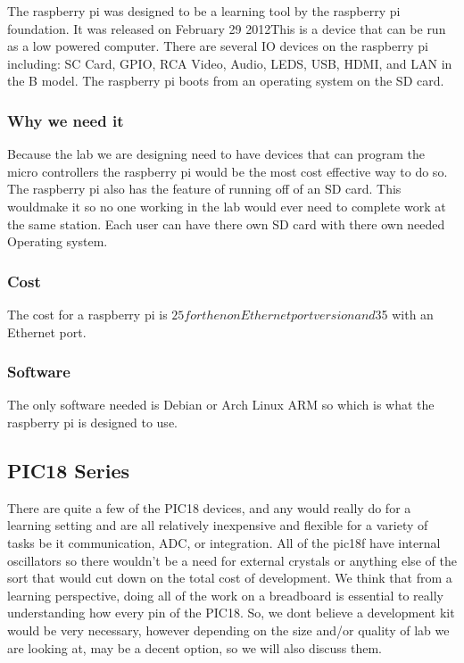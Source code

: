 \documentclass[12pt]{article}
\begin{document}
The raspberry pi was designed to be a learning tool by the raspberry pi
foundation. It was released on February 29 2012This is a device that can be run
as a low powered computer. There are several IO devices on the raspberry pi
including: SC Card, GPIO, RCA Video, Audio, LEDS, USB, HDMI, and LAN in
the B model. The raspberry pi boots from an operating system on the SD card.

\subsubsection{Why we need it}

Because the lab we are designing need to have devices that can program the
micro controllers the raspberry pi would be the most cost effective way to do so. \\

\noindent
The raspberry pi also has the feature of running off of an SD card. This wouldmake it so no one working in the lab would ever need to complete work at the
same station. Each user can have there own SD card with there own needed
Operating system.

\subsubsection{Cost}

The cost for a raspberry pi is $25 for the non Ethernet port version and $35 with
an Ethernet port.

\subsubsection{Software}

The only software needed is Debian or Arch Linux ARM so which is what the
raspberry pi is designed to use.

\subsection{PIC18 Series}
There are quite a few of the PIC18 devices, and any would really do for a learning setting
and are all relatively inexpensive and flexible for a variety of tasks be it communication, ADC,
or integration. All of the pic18f have internal oscillators so there wouldn't be a need for external
crystals or anything else of the sort that would cut down on the total cost of development. We
think that from a learning perspective, doing all of the work on a breadboard is essential to really
understanding how every pin of the PIC18. So, we dont believe a development kit would be very
necessary, however depending on the size and/or quality of lab we are looking at, may be a decent
option, so we will also discuss them.
\end{document}
